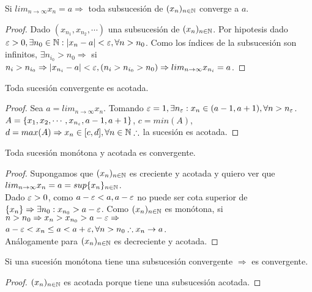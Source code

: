 \begin{theorem}
  Si $lim_{n \to \infty} x_n = a \Rightarrow$ toda subsucesión de $(x_n)_{n \in \mathbb{N}}$ converge a $a$.
  \begin{proof}
    Dado $(x_{n_1}, x_{n_2}, \cdots)$ una subsucesión de $(x_n)_{n \in \mathbb{N}}$. Por hipotesis dado $\varepsilon > 0, \exists n_0 \in \mathbb{N} : |x_n - a| < \varepsilon, \forall n > n_0$. Como los índices de la subsucesión son infinitos, $\exists n_{i_0} > n_0 \Rightarrow$ si $n_i > n_{i_0} \Rightarrow |x_{n_i} - a| < \varepsilon, (n_i > n_{i_0} > n_0) \Rightarrow lim_{n \to \infty} x_{n_i} = a$.
  \end{proof}
\end{theorem}

\begin{theorem}
  Toda sucesión convergente es acotada.
  \begin{proof}
    Sea $a = lim_{n \to \infty} x_n$. Tomando $\varepsilon = 1, \exists n_{\varepsilon} : x_n \in (a - 1, a+1), \forall n > n_{\varepsilon}$. \\
    $A = \{ x_1, x_2, \cdots, x_{n_{\varepsilon}}, a-1, a+1 \}$, $c = min(A)$, $d = max(A) \Rightarrow x_n \in [c, d], \forall n \in \mathbb{N} \therefore $ la sucesión es acotada.
  \end{proof}
\end{theorem}

\begin{theorem}
  Toda sucesión monótona y acotada es convergente.
  \begin{proof}
    Supongamos que $(x_n)_{n \in \mathbb{N}}$ es creciente y acotada y quiero ver que $lim_{n \to \infty} x_n = a = sup\{x_n\}_{n \in \mathbb{N}}$. \\
    Dado $\varepsilon > 0$, como $a-\varepsilon < a, a-\varepsilon$ no puede ser cota superior de $\{x_n\} \Rightarrow \exists n_0 : x_{n_0} > a - \varepsilon$.
    Como $(x_n)_{n \in \mathbb{N}}$ es monótona, si $n > n_0 \Rightarrow x_n > x_{n_0} > a - \varepsilon \Rightarrow$ \\
    $a-\varepsilon < x_n \leq a < a+\varepsilon, \forall n > n_0 \therefore x_n \to a$. \\
    Análogamente para $(x_n)_{n \in \mathbb{N}}$ es decreciente y acotada.
  \end{proof}
\end{theorem}

\begin{corollary}
  Si una sucesión monótona tiene una subsucesión convergente $\Rightarrow$ es convergente.
  \begin{proof}
    $(x_n)_{n \in \mathbb{N}}$ es acotada porque tiene una subsucesión acotada.
  \end{proof}
\end{corollary}

